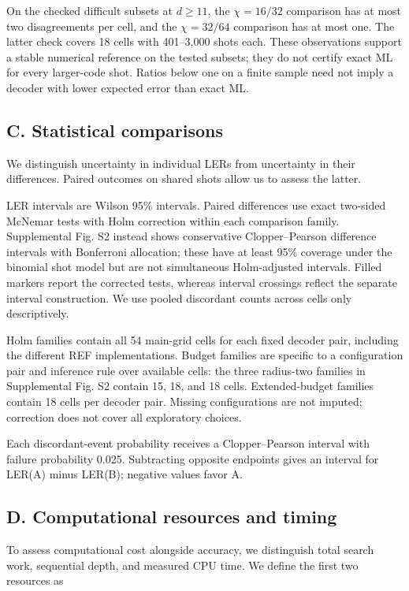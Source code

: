\documentclass[
  10pt,
]{article}
\begin{document}
On the checked difficult subsets at \(d\ge11\), the \(\chi=16/32\)
comparison has at most two disagreements per cell, and the
\(\chi=32/64\) comparison has at most one. The latter check covers 18
cells with 401--3,000 shots each. These observations support a stable
numerical reference on the tested subsets; they do not certify exact ML
for every larger-code shot. Ratios below one on a finite sample need not
imply a decoder with lower expected error than exact ML.

\subsection{C. Statistical
comparisons}\label{c.-statistical-comparisons}

We distinguish uncertainty in individual LERs from uncertainty in their
differences. Paired outcomes on shared shots allow us to assess the
latter.

LER intervals are Wilson 95\% intervals. Paired differences use exact
two-sided McNemar tests with Holm correction within each comparison
family. Supplemental Fig. S2 instead shows conservative Clopper--Pearson
difference intervals with Bonferroni allocation; these have at least
95\% coverage under the binomial shot model but are not simultaneous
Holm-adjusted intervals. Filled markers report the corrected tests,
whereas interval crossings reflect the separate interval construction.
We use pooled discordant counts across cells only descriptively.

Holm families contain all 54 main-grid cells for each fixed decoder
pair, including the different REF implementations. Budget families are
specific to a configuration pair and inference rule over available
cells: the three radius-two families in Supplemental Fig. S2 contain 15,
18, and 18 cells. Extended-budget families contain 18 cells per decoder
pair. Missing configurations are not imputed; correction does not cover
all exploratory choices.

Each discordant-event probability receives a Clopper--Pearson interval
with failure probability 0.025. Subtracting opposite endpoints gives an
interval for LER(A) minus LER(B); negative values favor A.

\subsection{D. Computational resources and
timing}\label{d.-computational-resources-and-timing}

To assess computational cost alongside accuracy, we distinguish total
search work, sequential depth, and measured CPU time. We define the
first two resources as
\end{document}
